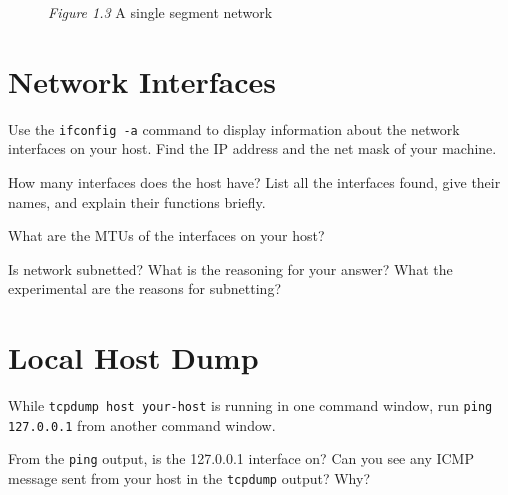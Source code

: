 \documentclass{../UTNetLab}
\begin{document}
\begin{center}
\begin{minipage}{0.48\textwidth}
\begin{flushright}
\begin{figure}[H]
                    \caption{\textit{Figure 1.3} A single segment network}        
                \end{figure}
            \end{flushright}
        \end{minipage}
    \end{center}

\section{Network Interfaces}
    Use the \lstinline{ifconfig -a} command to display information about the network interfaces on your host.
    Find the IP address and the net mask of your machine.
    
    \begin{report}
    \item How many interfaces does the host have?
    List all the interfaces found, give their names, and explain their functions briefly.

    \item What are the MTUs of the interfaces on your host?

    \item Is network subnetted?
    What is the reasoning for your answer? What the experimental are the reasons for subnetting?
    \end{report}


\section{Local Host Dump}
    While \lstinline[emph={your-host}]{tcpdump host your-host} is running in one command window, run \lstinline{ping 127.0.0.1} from another command window.
    
    \begin{report}
    \item From the \lstinline{ping} output, is the 127.0.0.1 interface on?
    Can you see any ICMP message sent from your host in the \lstinline{tcpdump} output?
    Why?
    \end{report}
\end{document}
